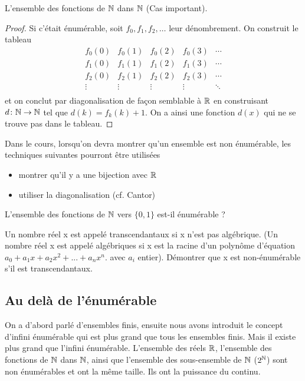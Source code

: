\begin{myexem}
  \label{exem:fNN}
 L'ensemble des fonctions de $\mathbb{N}$ dans $\mathbb{N}$ (Cas important).
 \begin{proof}
   Si c'était énumérable, soit $f_0, f_1, f_2, \ldots$ leur dénombrement.
   On construit le tableau
   \[
     \begin{array}{ccccc}
       f_0(0) & f_0(1) & f_0(2) & f_0(3) & \cdots\\
       f_1(0) & f_1(1) & f_1(2) & f_1(3) & \cdots\\
       f_2(0) & f_2(1) & f_2(2) & f_2(3) & \cdots\\
       \vdots & \vdots & \vdots & \vdots & \ddots\\
     \end{array}
   \]
   et on conclut par diagonalisation de façon semblable à $\mathbb{R}$
   en construisant $d\colon \mathbb{N} \to \mathbb{N}$ tel que $d(k) = f_k(k)+1$.
   On a ainsi une fonction $d(x)$ qui ne se trouve pas dans le tableau.
 \end{proof}
\end{myexem}

Dans le cours, lorsqu'on devra montrer qu'un ensemble est non énumérable,
les techniques suivantes pourront être utilisées
\begin{itemize}
	\item montrer qu'il y a une bijection avec  $\mathbb{R}$
	\item utiliser la diagonalisation (cf. Cantor)
\end{itemize}

\begin{myexercice}\label{exerc:conceptfct}
L'ensemble des fonctions de $\mathbb{N}$ vers $\{0,1\}$ est-il énumérable ?
\end{myexercice}


\begin{myexercice} \label{exerc:ensembleNonEnumNumTranscendantaux}
Un nombre réel x est appelé transcendantaux si x n'est pas algébrique. (Un nombre réel x est appelé algébriques si x est la racine d'un polynôme d'équation $a_0 + a_1x + a_2x^2 + ... + a_nx^n$.  avec $a_i$ entier).
Démontrer que x est non-énumérable s'il est transcendantaux.
\end{myexercice}

\subsection{Au delà de l'énumérable}
\label{subsec:au_dela_de_l_enumerable}
On a d'abord parlé d'ensembles finis, ensuite nous avons introduit le concept d'infini
énumérable qui est plus grand que tous les ensembles finis. Mais il existe plus grand
que l'infini énumérable.   L'ensemble des réels $\mathbb{R}$, l'ensemble des fonctions de $\mathbb{N}$ dans $\mathbb{N}$, ainsi que
l'ensemble des sous-ensemble de $\mathbb{N}$ ($2^{\mathbb{N}}$) sont non énumérables et ont la même taille.  Ils ont la puissance du continu.

